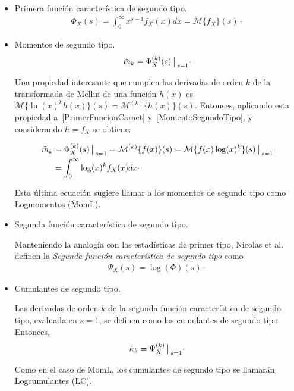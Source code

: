 \begin{itemize}
\item Primera función característica de segundo tipo.
	\begin{align}
	\Phi_X(s)=\int_{0}^{\infty} x^{s-1} f_X(x) dx = \mathcal{M}\{f_X\}(s)\cdot
	\label{PrimerFuncionCaract}
	\end{align}
\item Momentos de segundo tipo.
	\begin{align}
	\label{MomentoSegundoTipo}
	\tilde{m}_k=\Phi_X^{(k)}(s) \big\arrowvert _{s=1}\cdot
	\end{align}


	Una propiedad interesante que cumplen las derivadas de orden $k$ de la transformada de Mellin de una función $h(x)$ es $\mathcal{M}\{\ln(x)^k h(x)\}(s)=\mathcal{M}^{(k)}\{h(x)\}(s)$. Entonces, aplicando esta propiedad a~\eqref{PrimerFuncionCaract} y~\eqref{MomentoSegundoTipo}, y considerando $h=f_X$ se obtiene:

	\begin{align}
	\label{MomL}
	\nonumber \tilde{m}_k&=\Phi_X^{(k)}(s) \big\arrowvert _{s=1} =\mathcal{M}^{(k)}\{f(x)\}(s) =\mathcal{M}\{f(x) \log(x)^k\}(s)\big\arrowvert _{s=1}          \\
 	        &=\int_{0}^{\infty} \log(x)^k f_X(x) dx \cdot
	\end{align}

	Esta última ecuación sugiere llamar a los momentos de segundo tipo como Logmomentos (MomL).
	
\item Segunda función característica de segundo tipo.

      Manteniendo la analogía con las estadísticas de primer tipo, Nicolas et al.~\cite{nicolas2002} definen la \textit{Segunda función característica de segundo tipo} como
      \begin{align}
      \label{Sgunda Psi}
      \Psi_X(s)=\log(\Phi)(s)\cdot
      \end{align}
      
\item Cumulantes de segundo tipo.

	  Las derivadas de orden $k$ de la segunda función característica de segundo tipo, evaluada en $s=1$, se definen como los cumulantes de segundo tipo. Entonces,
	  \begin{align}
	  \label{CumulanteSegundoTipo}
	  \tilde{\kappa}_k=\Psi_X^{(k)}\big\arrowvert _{s=1}\cdot
	  \end{align}
	  
Como en el caso de MomL, los cumulantes de segundo tipo se llamarán Logcumulantes (LC).
\end{itemize}

